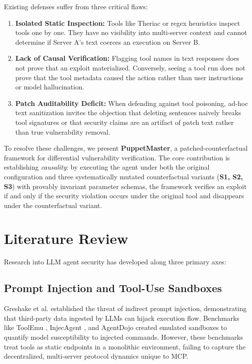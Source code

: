 \documentclass[conference]{IEEEtran}
\begin{document}
Existing defenses suffer from three critical flaws:
\begin{enumerate}
    \item \textbf{Isolated Static Inspection:} Tools like Theriac \cite{jamshidi2025securing} or regex heuristics inspect tools one by one. They have no visibility into multi-server context and cannot determine if Server A's text coerces an execution on Server B.
    \item \textbf{Lack of Causal Verification:} Flagging tool names in text responses does not prove that an exploit materialized. Conversely, seeing a tool run does not prove that the tool metadata caused the action rather than user instructions or model hallucination.
    \item \textbf{Patch Auditability Deficit:} When defending against tool poisoning, ad-hoc text sanitization invites the objection that deleting sentences naively breaks tool signatures or that security claims are an artifact of patch text rather than true vulnerability removal.
\end{enumerate}

To resolve these challenges, we present \textbf{PuppetMaster}, a patched-counterfactual framework for differential vulnerability verification. The core contribution is establishing \textit{causality}: by executing the agent under both the original configuration and three systematically mutated counterfactual variants (\textbf{S1, S2, S3}) with provably invariant parameter schemas, the framework verifies an exploit if and only if the security violation occurs under the original tool and disappears under the counterfactual variant.

\section{Literature Review}
Research into LLM agent security has developed along three primary axes:

\subsection{Prompt Injection and Tool-Use Sandboxes}
Greshake et al. \cite{greshake2023not} established the threat of indirect prompt injection, demonstrating that third-party data ingested by LLMs can hijack execution flow. Benchmarks like ToolEmu \cite{ruan2023toolemu}, InjecAgent \cite{zhan2024injecagent}, and AgentDojo \cite{debenedetti2024agentdojo} created emulated sandboxes to quantify model susceptibility to injected commands. However, these benchmarks treat tools as static endpoints in a monolithic environment, failing to capture the decentralized, multi-server protocol dynamics unique to MCP.
\end{document}
